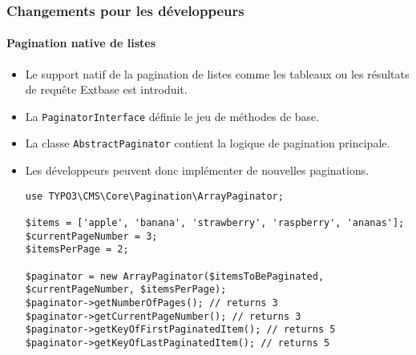 
\begin{frame}[fragile]
	\frametitle{Changements pour les développeurs}
	\framesubtitle{Pagination native de listes}

	\lstset{basicstyle=\tiny\ttfamily}

	\begin{itemize}
		\item Le support natif de la pagination de listes comme les tableaux ou
			les résultats de requête Extbase est introduit.
		\item La \texttt{PaginatorInterface} définie le jeu de méthodes de base.
		\item La classe \texttt{AbstractPaginator} contient la logique de pagination principale.
		\item Les développeurs peuvent donc implémenter de nouvelles paginations.
\begin{lstlisting}
use TYPO3\CMS\Core\Pagination\ArrayPaginator;

$items = ['apple', 'banana', 'strawberry', 'raspberry', 'ananas'];
$currentPageNumber = 3;
$itemsPerPage = 2;

$paginator = new ArrayPaginator($itemsToBePaginated, $currentPageNumber, $itemsPerPage);
$paginator->getNumberOfPages(); // returns 3
$paginator->getCurrentPageNumber(); // returns 3
$paginator->getKeyOfFirstPaginatedItem(); // returns 5
$paginator->getKeyOfLastPaginatedItem(); // returns 5
\end{lstlisting}

	\end{itemize}

\end{frame}


